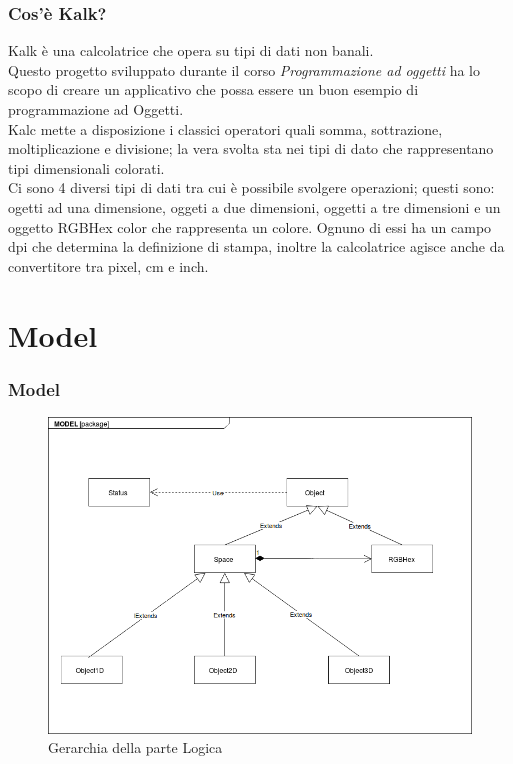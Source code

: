 \documentclass[10pt]{beamer}
\begin{document}
\begin{frame}
\frametitle{Cos'è Kalk?}
Kalk è una calcolatrice che opera su tipi di dati non banali. \\
Questo progetto sviluppato durante il corso \textit{Programmazione ad oggetti} ha lo scopo di creare un applicativo che possa essere un buon esempio di programmazione ad Oggetti. \\
Kalc mette a disposizione i classici operatori quali somma, sottrazione, moltiplicazione e divisione; la vera svolta sta nei tipi di dato che rappresentano tipi dimensionali colorati. \\
Ci sono 4 diversi tipi di dati tra cui è possibile svolgere operazioni; questi sono: ogetti ad una dimensione, oggeti a due dimensioni, oggetti a tre dimensioni e un oggetto RGBHex color che rappresenta un colore.
Ognuno di essi ha un campo dpi che determina la definizione di stampa, inoltre la calcolatrice agisce anche da convertitore tra pixel, cm e inch.



\end{frame}

\section{Model}
\begin{frame}
\frametitle{Model}

   \FloatBarrier
   \begin{figure}[ht]
   \centering
   \includegraphics[scale=0.30]{Gerarchia.png}
   \caption{Gerarchia della parte Logica}
\end{figure}


\end{frame}
\end{document}
